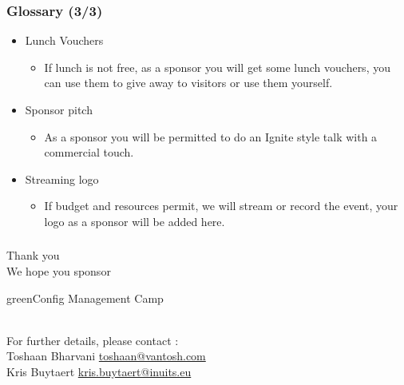 \begin{frame}
\frametitle{Glossary (3/3)}
\begin{itemize}
	\item<+->
	Lunch Vouchers
	\begin{itemize}
		\item<+->
		If lunch is not free, as a sponsor you will get some lunch vouchers, you can use them to give away to visitors or use them yourself.
	\end{itemize}
	\item<+->
	Sponsor pitch
	\begin{itemize}
		\item<+->
		As a sponsor you will be permitted to do an Ignite style talk with a commercial touch.
	\end{itemize}
	\item<+->
	Streaming logo
	\begin{itemize}
		\item<+->
		If budget and resources permit, we will stream or record the event, your logo as a sponsor will be added here.
	\end{itemize}
\end{itemize}
\end{frame}
%
\begin{frame}
\frametitle{}
\begin{center}
	\Huge{Thank you} \\
	\Huge{We hope you sponsor} \\
	\Huge{\begin{color}{green}Config Management Camp\end{color}} \\
	\normalsize{For further details, please contact :} \\
	\Large{Toshaan Bharvani \href{mailto:toshaan@vantosh.com}{toshaan@vantosh.com}} \\
	\Large{Kris Buytaert \href{mailto:kris.buytaert@inuits.eu}{kris.buytaert@inuits.eu}}
\end{center}
\end{frame}


